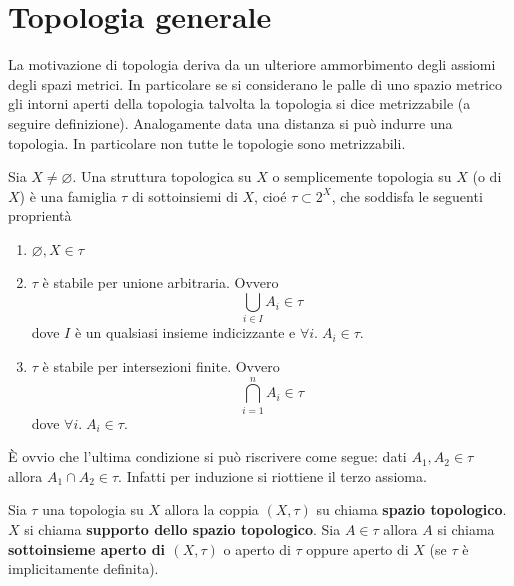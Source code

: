 \chapter{Topologia generale}

La motivazione di topologia deriva da un ulteriore ammorbimento degli assiomi degli spazi metrici. In particolare se si considerano le palle di uno spazio metrico gli intorni aperti della topologia talvolta la topologia si dice metrizzabile (a seguire definizione). Analogamente data una distanza si può indurre una topologia. In particolare non tutte le topologie sono metrizzabili. 

\begin{definition}
	Sia $X \neq \varnothing$. Una struttura topologica su $X$ o semplicemente topologia su $X$ (o di $X$) è una famiglia $\tau$ di sottoinsiemi di $X$, cioé $\tau \subset 2^X$, che soddisfa le seguenti proprientà
	\begin{enumerate}
		\item $\varnothing, X \in \tau$
		\item $\tau$ è stabile per unione arbitraria. Ovvero 
		\begin{equation}
			\bigcup_{i \in I} A_i \in \tau 	
		\end{equation}
		dove $I$ è un qualsiasi insieme indicizzante e $\forall i. \; A_i \in \tau$.
		\item $\tau$ è stabile per intersezioni finite. Ovvero 
		\begin{equation}
			\bigcap^n_{i=1} A_i \in \tau
		\end{equation}
		dove $\forall i. \; A_i \in \tau$.
	\end{enumerate} 
\end{definition}

\begin{remark}
	È ovvio che l'ultima condizione si può riscrivere come segue: dati $A_1, A_2 \in \tau$ allora $A_1 \cap A_2 \in \tau$. Infatti per induzione si riottiene il terzo assioma. 
\end{remark}

\begin{definition}
	Sia $\tau$ una topologia su $X$ allora la coppia $(X, \tau)$ su chiama \textbf{spazio topologico}. $X$ si chiama \textbf{supporto dello spazio topologico}. Sia $A \in \tau$ allora $A$ si chiama \textbf{sottoinsieme aperto di $(X,\tau)$} o aperto di $\tau$ oppure aperto di $X$ (se $\tau$ è implicitamente definita). 	
\end{definition}

